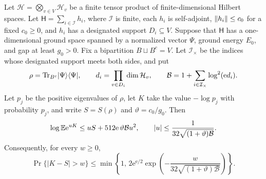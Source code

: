 \begin{lemma}
\label{lem:tail}
Let $\mathcal H=\bigotimes_{v\in V}\mathcal H_v$ be a finite tensor product
of finite-dimensional Hilbert spaces.  Let
$\mathsf H=\sum_{i\in\mathcal I} h_i$, where $\mathcal I$ is finite,
each $h_i$ is self-adjoint, $\lVert h_i\rVert\le c_0$ for a fixed $c_0\ge0$,
and $h_i$ has a designated support $D_i\subseteq V$.  Suppose that
$\mathsf H$ has a one-dimensional ground space spanned by a normalized
vector $\Psi$, ground energy $E_0$, and gap at least $g_0>0$.  Fix a
bipartition $B\sqcup B^c=V$.  Let $\mathcal I_\times$ be the indices
whose designated support meets both sides, and put
\[
 \rho=\operatorname{Tr}_{B^c}\lvert \Psi\rangle\langle \Psi\rvert,\qquad
 d_i=\prod_{v\in D_i}\dim\mathcal H_v,\qquad
 \mathcal B=1+\sum_{i\in\mathcal I_\times}\log^2(\mathrm e d_i).
\]
Let $p_j$ be the positive eigenvalues of $\rho$, let $K$ take the value
$-\log p_j$ with probability $p_j$, and write $S=S(\rho)$ and
$\vartheta=c_0/g_0$.  Then
\begin{equation}
 \log\mathbb E\mathrm e^{uK}
 \le uS+512\mathrm e\,\vartheta\mathcal B u^2,
 \qquad
 |u|\le\frac{1}{32\sqrt{(1+\vartheta)\mathcal B}}.
 \label{eq:initial-tail-mgf}
\end{equation}
Consequently, for every $w\ge0$,
\begin{equation}
 \Pr\{|K-S|>w\}
 \le \min\left\{1,\,
  2\mathrm e^{\mathrm e/2}
  \exp\left(-\frac{w}{32\sqrt{(1+\vartheta)\mathcal B}}\right)
              \right\}.
 \label{eq:initial-tail-probability}
\end{equation}
\end{lemma}

